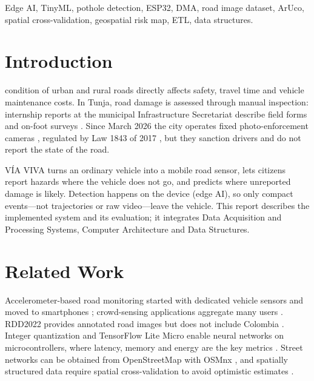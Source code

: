 \documentclass[journal,10pt]{IEEEtran}
\begin{document}
\begin{IEEEkeywords}
Edge AI, TinyML, pothole detection, ESP32, DMA, road image dataset, ArUco, spatial cross-validation, geospatial risk map, ETL, data structures.
\end{IEEEkeywords}

\section{Introduction}
 condition of urban and rural roads directly affects safety, travel time and vehicle maintenance costs. In Tunja, road damage is assessed through manual inspection: internship reports at the municipal Infrastructure Secretariat describe field forms and on-foot surveys \cite{caballero2022practica}. Since March 2026 the city operates fixed photo-enforcement cameras \cite{infobae2026tunja}, regulated by Law 1843 of 2017 \cite{ley1843}, but they sanction drivers and do not report the state of the road.

V\'IA VIVA turns an ordinary vehicle into a mobile road sensor, lets citizens report hazards where the vehicle does not go, and predicts where unreported damage is likely. Detection happens on the device (edge AI), so only compact events---not trajectories or raw video---leave the vehicle. This report describes the implemented system and its evaluation; it integrates Data Acquisition and Processing Systems, Computer Architecture and Data Structures.

\section{Related Work}
Accelerometer-based road monitoring started with dedicated vehicle sensors \cite{eriksson2008pothole} and moved to smartphones \cite{mohan2008nericell,mednis2011pothole}; crowd-sensing applications aggregate many users \cite{kalim2016crater}. RDD2022 provides annotated road images but does not include Colombia \cite{arya2022rdd}. Integer quantization \cite{jacob2018quant} and TensorFlow Lite Micro \cite{david2021tflm} enable neural networks on microcontrollers, where latency, memory and energy are the key metrics \cite{banbury2020tinyml}. Street networks can be obtained from OpenStreetMap with OSMnx \cite{osm,boeing2017osmnx}, and spatially structured data require spatial cross-validation to avoid optimistic estimates \cite{roberts2017cv}.
\end{document}
